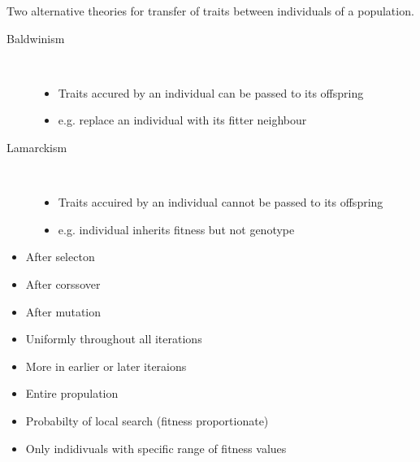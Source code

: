 \documentclass[a4paper]{article}
\begin{document}

Two alternative theories for transfer of traits between individuals of a
population.

\begin{description}
  \item[Baldwinism] \hfill \\
    \begin{itemize}
      \item Traits accured by an individual can be passed to its offspring
      \item e.g. replace an individual with its fitter neighbour
    \end{itemize}
    
  \item[Lamarckism] \hfill \\
    \begin{itemize}
      \item Traits accuired by an individual cannot be passed to its offspring
      \item e.g. individual inherits fitness but not genotype
    \end{itemize}
    
\end{description}


\begin{itemize}
  \item After selecton
  \item After corssover
  \item After mutation
\end{itemize}


\begin{itemize}
  \item Uniformly throughout all iterations
  \item More in earlier or later iteraions
\end{itemize}


\begin{itemize}
  \item Entire propulation
  \item Probabilty of local search (fitness proportionate)
  \item Only indidivuals with specific range of fitness values
\end{itemize}
\end{document}
